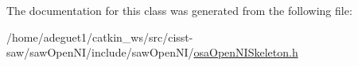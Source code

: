 The documentation for this class was generated from the following file\-:\begin{DoxyCompactItemize}
\item 
/home/adeguet1/catkin\-\_\-ws/src/cisst-\/saw/saw\-Open\-N\-I/include/saw\-Open\-N\-I/\hyperlink{osa_open_n_i_skeleton_8h}{osa\-Open\-N\-I\-Skeleton.\-h}\end{DoxyCompactItemize}
